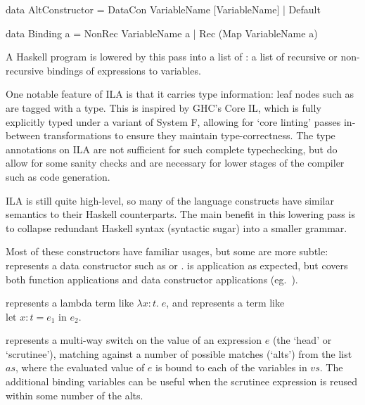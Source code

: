 \documentclass[dissertation.tex]{subfiles}
\begin{document}
{{{{\begin{haskellfigure}
                data AltConstructor = DataCon VariableName [VariableName]
                                    | Default

                data Binding a = NonRec VariableName a
                               | Rec (Map VariableName a)
                \end{haskellfigure}

                A Haskell program is lowered by this pass into a list of : a list of recursive or
                non-recursive bindings of expressions to variables.

                One notable feature of ILA is that it carries type information: leaf nodes such as  are
                tagged with a type. This is inspired by GHC's Core IL, which is fully explicitly typed under a variant
                of System F, allowing for `core linting' passes in-between transformations to ensure they maintain
                type-correctness. The type annotations on ILA are not sufficient for such complete typechecking, but do
                allow for some sanity checks and are necessary for lower stages of the compiler such as code generation.

                ILA is still quite high-level, so many of the language constructs have similar semantics to their
                Haskell counterparts. The main benefit in this lowering pass is to collapse redundant Haskell syntax
                (syntactic sugar) into a smaller grammar.

                Most of these constructors have familiar usages, but some are more subtle:  represents a
                data constructor such as  or .  is application as expected,
                but covers both function applications and data constructor applications (eg.\ ).

                 represents a lambda term like \(\lambda x : t.\;e\), and  represents a term like \(\text{let } x:t = e_1 \text{ in } e_2\).

                 represents a multi-way switch on the value of an expression \(e\) (the
                `head' or `scrutinee'), matching against a number of possible matches (`alts') from the list \(as\),
                where the evaluated value of \(e\) is bound to each of the variables in \(vs\). The additional binding
                variables can be useful when the scrutinee expression is reused within some number of the alts.

}}}}
\end{document}
